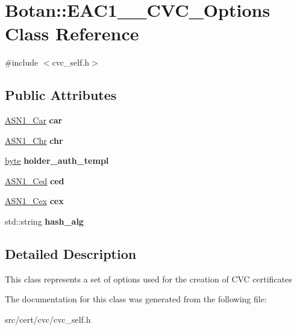 \hypertarget{classBotan_1_1EAC1__1__CVC__Options}{\section{Botan\-:\-:E\-A\-C1\-\_\-\_\-\-C\-V\-C\-\_\-\-Options Class Reference}
\label{classBotan_1_1EAC1__1__CVC__Options}
}


{\ttfamily \#include $<$cvc\-\_\-self.\-h$>$}

\subsection*{Public Attributes}
\begin{DoxyCompactItemize}
\item 
\hypertarget{classBotan_1_1EAC1__1__CVC__Options_adc01518f5e54385bc32fe637bc215ab3}{\hyperlink{classBotan_1_1ASN1__Car}{A\-S\-N1\-\_\-\-Car} {\bfseries car}}\label{classBotan_1_1EAC1__1__CVC__Options_adc01518f5e54385bc32fe637bc215ab3}

\item 
\hypertarget{classBotan_1_1EAC1__1__CVC__Options_ad4a63fbd61a69977464673aa610b92b5}{\hyperlink{classBotan_1_1ASN1__Chr}{A\-S\-N1\-\_\-\-Chr} {\bfseries chr}}\label{classBotan_1_1EAC1__1__CVC__Options_ad4a63fbd61a69977464673aa610b92b5}

\item 
\hypertarget{classBotan_1_1EAC1__1__CVC__Options_ad987e18803010d164fc8da406c93e5d0}{\hyperlink{namespaceBotan_a7d793989d801281df48c6b19616b8b84}{byte} {\bfseries holder\-\_\-auth\-\_\-templ}}\label{classBotan_1_1EAC1__1__CVC__Options_ad987e18803010d164fc8da406c93e5d0}

\item 
\hypertarget{classBotan_1_1EAC1__1__CVC__Options_a3c919c634ea156c25bc490c54ab39fee}{\hyperlink{classBotan_1_1ASN1__Ced}{A\-S\-N1\-\_\-\-Ced} {\bfseries ced}}\label{classBotan_1_1EAC1__1__CVC__Options_a3c919c634ea156c25bc490c54ab39fee}

\item 
\hypertarget{classBotan_1_1EAC1__1__CVC__Options_a9d1e7ab6f6e18d6911d1ce5f35cdbc10}{\hyperlink{classBotan_1_1ASN1__Cex}{A\-S\-N1\-\_\-\-Cex} {\bfseries cex}}\label{classBotan_1_1EAC1__1__CVC__Options_a9d1e7ab6f6e18d6911d1ce5f35cdbc10}

\item 
\hypertarget{classBotan_1_1EAC1__1__CVC__Options_a1cce5257c2589a5815f6e3ce3192fdaa}{std\-::string {\bfseries hash\-\_\-alg}}\label{classBotan_1_1EAC1__1__CVC__Options_a1cce5257c2589a5815f6e3ce3192fdaa}

\end{DoxyCompactItemize}


\subsection{Detailed Description}
This class represents a set of options used for the creation of C\-V\-C certificates 

The documentation for this class was generated from the following file\-:\begin{DoxyCompactItemize}
\item 
src/cert/cvc/cvc\-\_\-self.\-h\end{DoxyCompactItemize}
